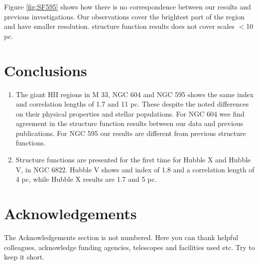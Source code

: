 \documentclass[fleqn,usenatbib]{mnras}
\begin{document}
Figure \ref{fig:SF595} shows how there is no correspondence between our results and previous investigations. Our observations cover the brightest part of the region and have smaller resolution. \citet{lagrois2011} structure function results does not cover scales $<$10 pc.



\section{Conclusions}\label{sec:concl}

\begin{enumerate}
    \item The giant HII regions in  M 33, NGC 604 and NGC 595 shows the same index and correlation lengths of 1.7 and 11 pc. These despite the noted differences on their physical properties and stellar populations. For NGC 604 wee find agreement in the structure function results between our data and previous publications. For NGC 595 our results are different from previous structure functions.
    
    \item Structure functions are presented for the first time for Hubble X and Hubble V, in NGC 6822. Hubble V shows and index of 1.8 and a correlation length of 4 pc, while Hubble X results are 1.7 and 5 pc.
    
\end{enumerate}


\section*{Acknowledgements}

The Acknowledgements section is not numbered. Here you can thank helpful
colleagues, acknowledge funding agencies, telescopes and facilities used etc.
Try to keep it short.






\bsp	%
\label{lastpage}
\end{document}
